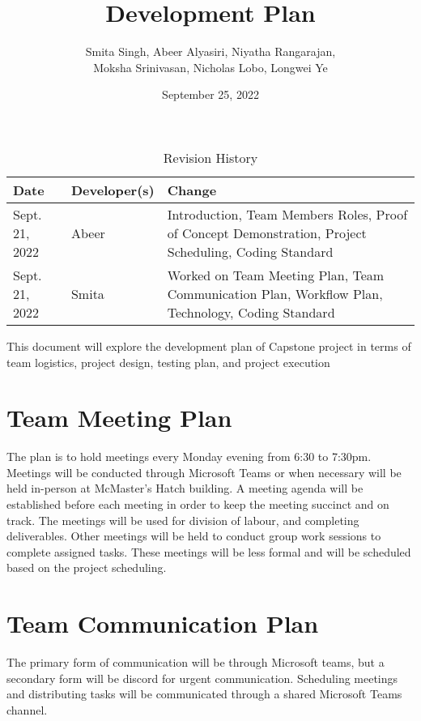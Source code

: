 \documentclass{article}
\date{September 25, 2022}
\begin{document}
\title{Development Plan\\\prognam}

\author{Smita Singh, Abeer Alyasiri, Niyatha Rangarajan,\\ Moksha Srinivasan, Nicholas Lobo, Longwei Ye}

\begin{table}[hp]
\caption{Revision History} \label{TblRevisionHistory}
\begin{tabularx}{\textwidth}{llX}
\toprule
\textbf{Date} & \textbf{Developer(s)} & \textbf{Change}\\
\midrule
Sept. 21, 2022 & Abeer & Introduction, Team Members Roles, Proof of Concept Demonstration, Project Scheduling, Coding Standard \\
Sept. 21, 2022 & Smita & Worked on Team Meeting Plan, Team Communication Plan, Workflow Plan, Technology, Coding Standard\\
\bottomrule
\end{tabularx}
\end{table}

\newpage

\maketitle

This document will explore the development plan of Capstone project in terms of team logistics, project design, testing plan, and project execution %

\section{Team Meeting Plan}
The plan is to hold meetings every Monday evening from 6:30 to 7:30pm. Meetings will be conducted through Microsoft Teams or when necessary will be held in-person at McMaster's Hatch building. A meeting agenda will be established before each meeting in order to keep the meeting succinct and on track. The meetings will be used for division of labour, and completing deliverables. %
Other meetings will be held to conduct group work sessions to complete assigned tasks. These meetings will be less formal and will be scheduled based on the project scheduling.

\section{Team Communication Plan}
The primary form of communication will be through Microsoft teams, but a secondary form will be discord for urgent communication. Scheduling meetings and distributing tasks will be communicated through a shared Microsoft Teams channel. %
\end{document}
